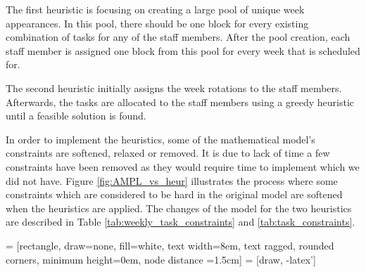 
The first heuristic is focusing on creating a large pool of unique week appearances. In this pool, there should be one block for every existing combination of tasks for any of the staff members. After the pool creation, each staff member is assigned one block from this pool for every week that is scheduled for.

The second heuristic initially assigns the week rotations to the staff members. Afterwards, the tasks are allocated to the staff members using a greedy heuristic until a feasible solution is found.

In order to implement the heuristics, some of the mathematical model's constraints are softened, relaxed or removed. It is due to lack of time a few constraints have been removed as they would require time to implement which we did not have. Figure \ref{fig:AMPL_vs_heur} illustrates the process where some constraints which are considered to be hard in the original model are softened when the heuristics are applied. The changes of the model for the two heuristics are described in Table \ref{tab:weekly_task_constraints} and \ref{tab:task_constraints}.



 = [rectangle, draw=none, fill=white,
    text width=8em, text ragged, rounded corners, minimum height=0em, node distance =1.5cm]
 = [draw, -latex']
    
\newcommand*{\h}{\hspace{18pt}}%
\newcommand*{\hh}{\hspace{24pt}}%

